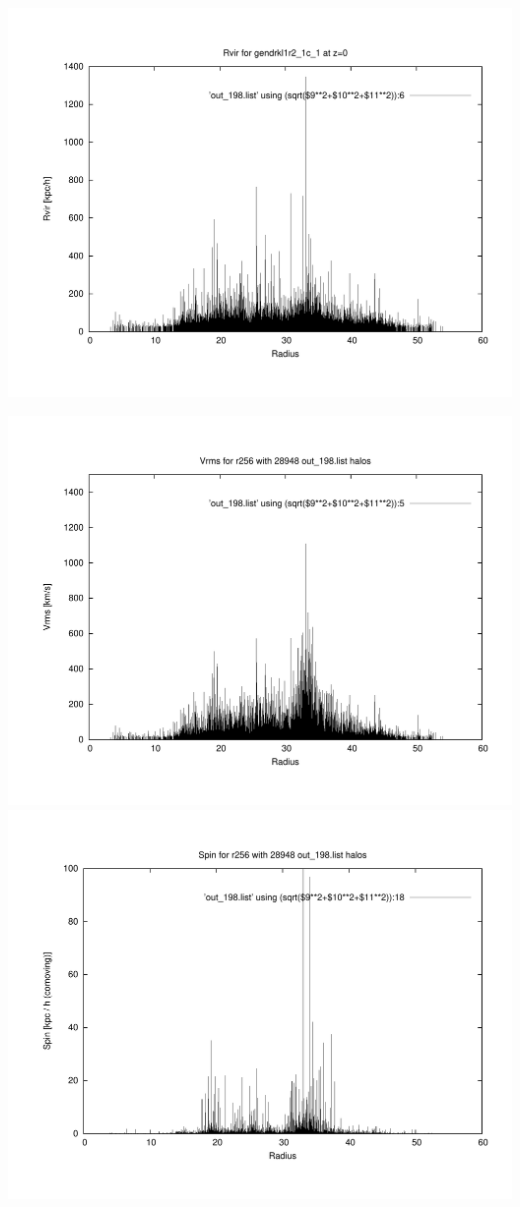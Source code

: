 \includegraphics[scale=0.3]{gendrkl1r2_1c_1/plot_rvir_z0.pdf}

\includegraphics[scale=0.3]{gendrkl1r2_1c_1/plot_Vrms_out_198.pdf}
\includegraphics[scale=0.3]{gendrkl1r2_1c_1/plot_spin_out_198.pdf}

